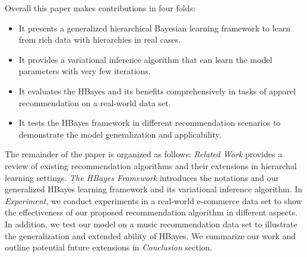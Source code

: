 Overall this paper makes contributions in four folds:

\begin{itemize}
\item It presents a generalized hierarchical Bayesian learning framework to learn from rich data with hierarchies in real cases.
\item It provides a variational inference algorithm that can learn the model parameters with very few iterations.
\item It evaluates the HBayes and its benefits comprehensively in tasks of apparel recommendation on a real-world data set. 
\item It tests the HBayes framework in different recommendation scenarios to demonstrate the model generalization and applicability.
\end{itemize}

The remainder of the paper is organized as follows: \textit{Related Work} provides a review of existing recommendation algorithms and their extensions in hierarchal learning settings.  \textit{The HBayes Framework} introduces the notations and our generalized HBayes learning framework and its variational inference algorithm. In \textit{Experiment}, we conduct experiments in a real-world e-commerce data set to show the effectiveness of our proposed recommendation algorithm in different aspects. In addition, we test our model on a music recommendation data set to illustrate the generalization and extended ability of HBayes. We summarize our work and outline potential future extensions in \textit{Conclusion} section.

